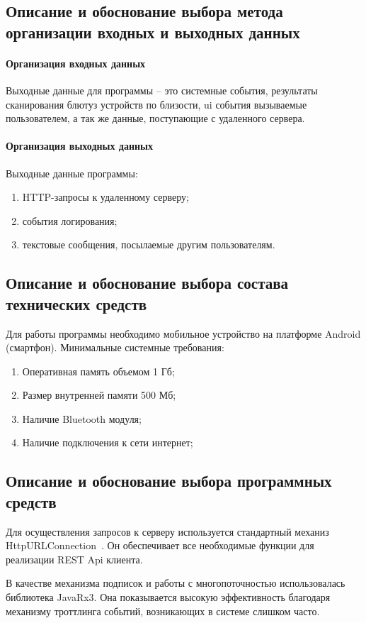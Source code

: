 \documentclass[explnote]{espd}
\begin{document}
\subsection{Описание и обоснование выбора метода организации входных и выходных данных}
\paragraph{Организация входных данных}
Выходные данные для программы -- это системные события, результаты сканирования блютуз устройств по близости, ui события вызываемые пользователем, а так же данные, поступающие с удаленного сервера.

\paragraph{Организация выходных данных}\label{paragraph:output}
Выходные данные программы:

\begin{enumerate}
\item HTTP-запросы к удаленному серверу;
\item события логирования;
\item текстовые сообщения, посылаемые другим пользователям.
\end{enumerate}

\subsection{Описание и обоснование выбора состава технических средств}
Для работы программы необходимо мобильное устройство на платформе Android (смартфон). Минимальные системные требования:

\begin{enumerate}
\item Оперативная память объемом 1 Гб;
\item Размер внутренней памяти 500 Мб;
\item Наличие Bluetooth модуля;
\item Наличие подключения к сети интернет;
\end{enumerate}

\subsection{Описание и обоснование выбора программных средств}
Для осуществления запросов к серверу используется стандартный механиз HttpURLConnection~\cite{httpUrl}. Он обеспечивает все необходимые функции для реализации REST Api клиента.

В качестве механизма подписок и работы с многопоточностью использовалась библиотека JavaRx3. Она показывается высокую эффективность благодаря механизму троттлинга событий, возникающих в системе слишком часто. 


\end{document}

